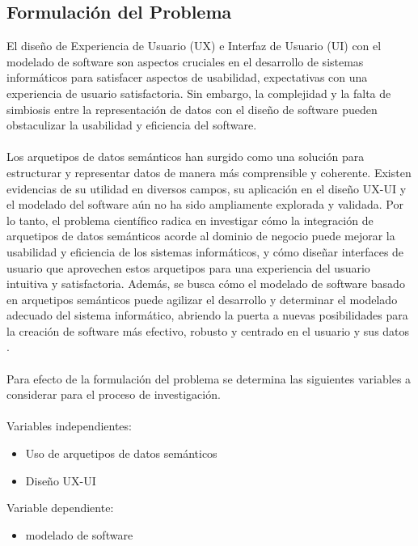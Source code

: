 \documentclass[12pt,a4paper]{article}
\begin{document}
\subsection{Formulación del Problema}
\label{sec:2}
El diseño de Experiencia de Usuario (UX) e Interfaz de Usuario (UI) con el modelado de software son aspectos cruciales en el desarrollo de sistemas informáticos para satisfacer aspectos de usabilidad, expectativas con una experiencia de usuario satisfactoria. Sin embargo, la complejidad y la falta de simbiosis entre la representación de datos con el diseño de software pueden obstaculizar la usabilidad y eficiencia del software. 
\\\\
Los arquetipos de datos semánticos han surgido como una solución para estructurar y representar datos de manera más comprensible y coherente. Existen evidencias de su utilidad en diversos campos, su aplicación en el diseño UX-UI y el modelado del software aún no ha sido ampliamente explorada y validada. Por lo tanto, el problema científico radica en investigar cómo la integración de arquetipos de datos semánticos acorde al dominio de negocio puede mejorar la usabilidad y eficiencia de los sistemas informáticos, y cómo diseñar interfaces de usuario que aprovechen estos arquetipos para una experiencia del usuario intuitiva y satisfactoria. Además, se busca cómo el modelado de software basado en arquetipos semánticos puede agilizar el desarrollo y determinar el modelado adecuado del sistema informático, abriendo la puerta a nuevas posibilidades para la creación de software más efectivo, robusto y centrado en el usuario y sus datos \cite{Inga2023}.
\\\\
Para efecto de la formulación del problema se determina las siguientes variables a considerar para el proceso de investigación.
\\\\
Variables independientes: 
\begin{itemize}
  \item Uso de arquetipos de datos semánticos
  \item Diseño UX-UI
\end{itemize}
Variable dependiente:
\begin{itemize}
  \item modelado de software
\end{itemize}
\end{document}
